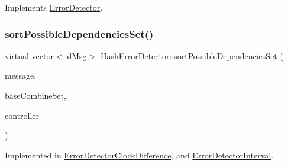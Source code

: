 Implements \hyperlink{class_error_detector_a8cac1f6ac6803da4379df7891789c490}{Error\+Detector}.

\mbox{\label{class_hash_error_detector_ad7419eaab728b7ed3e394d5aee9eda41}} 
\subsubsection{\texorpdfstring{sort\+Possible\+Dependencies\+Set()}{sortPossibleDependenciesSet()}}
{\footnotesize\ttfamily virtual vector$<$\hyperlink{structures_8h_a83a1d9a070efa5341da84cfd8e28d3e5}{id\+Msg}$>$ Hash\+Error\+Detector\+::sort\+Possible\+Dependencies\+Set (\begin{DoxyParamCaption}\item[{const \hyperlink{structures_8h_a7e7bdc1d2fff8a9436f2f352b2711ed6}{message\+Info} \&}]{message,  }\item[{const vector$<$ \hyperlink{structures_8h_a7e7bdc1d2fff8a9436f2f352b2711ed6}{message\+Info} $>$ \&}]{base\+Combine\+Set,  }\item[{\hyperlink{class_controller}{Controller} $\ast$}]{controller }\end{DoxyParamCaption})\hspace{0.3cm}{\ttfamily [pure virtual]}}



Implemented in \hyperlink{class_error_detector_clock_difference_a740f6bd74b30e0b194c4b64d79bb8caf}{Error\+Detector\+Clock\+Difference}, and \hyperlink{class_error_detector_interval_abe98fbb4f13aeb919d2c2e8755f003ae}{Error\+Detector\+Interval}.

\mbox{\label{class_hash_error_detector_a1c7fe649a34cf7e139ce53a248dce748}} 
